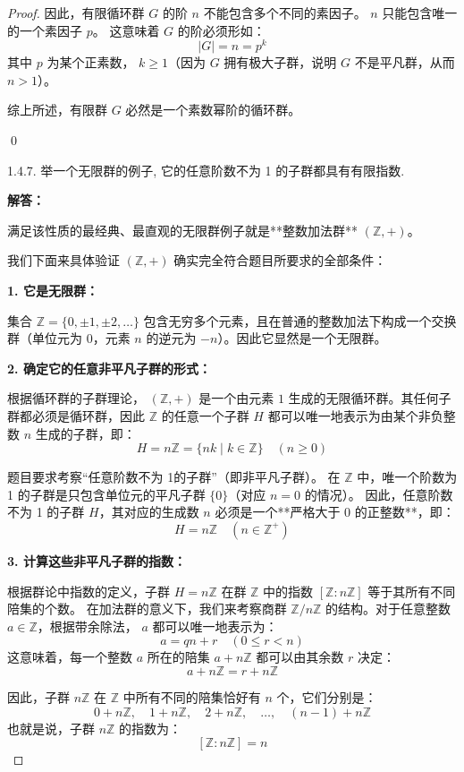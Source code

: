 \documentclass[]{article}
\begin{document}
\begin{proof}
因此，有限循环群 $G$ 的阶 $n$ 不能包含多个不同的素因子。 $n$ 只能包含唯一的一个素因子 $p$。
这意味着 $G$ 的阶必须形如：
\[ |G| = n = p^k \]
其中 $p$ 为某个正素数， $k \ge 1$（因为 $G$ 拥有极大子群，说明 $G$ 不是平凡群，从而 $n > 1$）。

\bigskip
综上所述，有限群 $G$ 必然是一个素数幂阶的循环群。

\qed

1.4.7. 举一个无限群的例子, 它的任意阶数不为 1 的子群都具有有限指数. 

\bigskip
\noindent \textbf{解答：} 

满足该性质的最经典、最直观的无限群例子就是**整数加法群** $(\mathbb{Z}, +)$。

我们下面来具体验证 $(\mathbb{Z}, +)$ 确实完全符合题目所要求的全部条件：

\bigskip
\noindent \textbf{1. 它是无限群：}

集合 $\mathbb{Z} = \{0, \pm 1, \pm 2, \dots \}$ 包含无穷多个元素，且在普通的整数加法下构成一个交换群（单位元为 $0$，元素 $n$ 的逆元为 $-n$）。因此它显然是一个无限群。

\bigskip
\noindent \textbf{2. 确定它的任意非平凡子群的形式：}

根据循环群的子群理论， $(\mathbb{Z}, +)$ 是一个由元素 $1$ 生成的无限循环群。其任何子群都必须是循环群，因此 $\mathbb{Z}$ 的任意一个子群 $H$ 都可以唯一地表示为由某个非负整数 $n$ 生成的子群，即：
\[ H = n\mathbb{Z} = \{ nk \mid k \in \mathbb{Z} \} \quad (n \ge 0) \]

题目要求考察“任意阶数不为 1的子群”（即非平凡子群）。
在 $\mathbb{Z}$ 中，唯一个阶数为 1 的子群是只包含单位元的平凡子群 $\{0\}$（对应 $n = 0$ 的情况）。
因此，任意阶数不为 1 的子群 $H$，其对应的生成数 $n$ 必须是一个**严格大于 0 的正整数**，即：
\[ H = n\mathbb{Z} \quad (n \in \mathbb{Z}^+) \]

\bigskip
\noindent \textbf{3. 计算这些非平凡子群的指数：}

根据群论中指数的定义，子群 $H = n\mathbb{Z}$ 在群 $\mathbb{Z}$ 中的指数 $[\mathbb{Z} : n\mathbb{Z}]$ 等于其所有不同陪集的个数。
在加法群的意义下，我们来考察商群 $\mathbb{Z} / n\mathbb{Z}$ 的结构。对于任意整数 $a \in \mathbb{Z}$，根据带余除法， $a$ 都可以唯一地表示为：
\[ a = qn + r \quad (0 \le r < n) \]
这意味着，每一个整数 $a$ 所在的陪集 $a + n\mathbb{Z}$ 都可以由其余数 $r$ 决定：
\[ a + n\mathbb{Z} = r + n\mathbb{Z} \]

因此，子群 $n\mathbb{Z}$ 在 $\mathbb{Z}$ 中所有不同的陪集恰好有 $n$ 个，它们分别是：
\[ 0 + n\mathbb{Z}, \quad 1 + n\mathbb{Z}, \quad 2 + n\mathbb{Z}, \quad \dots, \quad (n-1) + n\mathbb{Z} \]
也就是说，子群 $n\mathbb{Z}$ 的指数为：
\[ [\mathbb{Z} : n\mathbb{Z}] = n \]


\end{proof}
\end{document}
